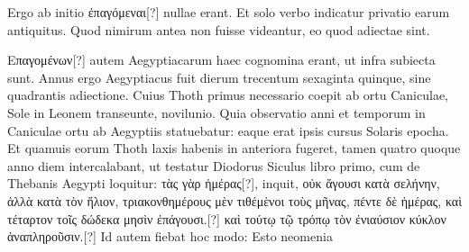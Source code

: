 Ergo ab initio \textgreek{ἐπαγόμεναι}[?]
nullae erant.
Et solo
verbo indicatur privatio earum
antiquitus.
Quod nimirum antea
non fuisse videantur, eo
quod adiectae sint.
%
%
\begin{table}[h]
  
\end{table}
\textgreek{Επαγομένων}[?]
autem Aegyptiacarum haec cognomina erant, ut infra subiecta sunt.
Annus ergo Aegyptiacus fuit dierum trecentum sexaginta quinque,
sine quadrantis adiectione.
Cuius Thoth primus necessario coepit ab
ortu Caniculae, Sole in Leonem transeunte, novilunio.
Quia
observatio anni et temporum in Caniculae ortu ab Aegyptiis statuebatur:
eaque erat ipsis cursus Solaris epocha.
Et quamuis eorum Thoth
laxis habenis in anteriora fugeret, tamen quatro quoque anno diem
intercalabant, ut testatur Diodorus Siculus libro primo, cum de
Thebanis Aegypti loquitur: \textgreek{τὰς γὰρ ἡμέρας}[?], inquit,
 \textgreek{οὐκ ἄγουσι κατὰ σελήνην,
ἀλλὰ κατὰ τὸν ἥλιον, τριακονθημέρους μὲν τιθέμὲνοι τοὺς μῆνας, πέντε
δὲ ἡμέρας, καὶ τέταρτον τοῖς δώδεκα μησὶν ἐπάγουσι.}[?]
\textgreek{καὶ τούτῳ τῷ τρόπῳ τὸν ἐνιαύσιον κύκλον ἀναπληροῦσιν.}[?]
Id autem fiebat hoc modo: Esto neomenia
